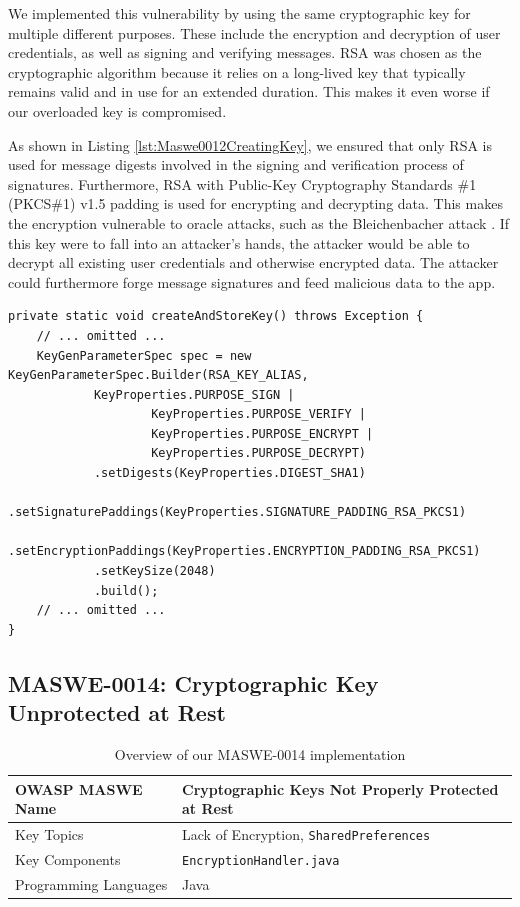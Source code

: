 We implemented this vulnerability by using the same cryptographic key for multiple different purposes. These include the encryption and decryption of user credentials, as well as signing and verifying messages. RSA was chosen as the cryptographic algorithm because it relies on a long-lived key that typically remains valid and in use for an extended duration. This makes it even worse if our overloaded key is compromised.

As shown in Listing \ref{lst:Maswe0012CreatingKey}, we ensured that only RSA is used for message digests involved in the signing and verification process of signatures. Furthermore, RSA with Public-Key Cryptography Standards \#1 (PKCS\#1) v1.5 padding is used for encrypting and decrypting data. This makes the encryption vulnerable to oracle attacks, such as the Bleichenbacher attack \cite{bleichenbacher1998}. If this key were to fall into an attacker's hands, the attacker would be able to decrypt all existing user credentials and otherwise encrypted data. The attacker could furthermore forge message signatures and feed malicious data to the app.

\begin{lstlisting}[style=JavaStyle, float=tbh, mathescape=true, captionpos=b, caption={Creating an RSA key with multiple functionalities}, label=lst:Maswe0012CreatingKey]
private static void createAndStoreKey() throws Exception {
    // ... omitted ...
    KeyGenParameterSpec spec = new KeyGenParameterSpec.Builder(RSA_KEY_ALIAS,
            KeyProperties.PURPOSE_SIGN |
                    KeyProperties.PURPOSE_VERIFY |
                    KeyProperties.PURPOSE_ENCRYPT |
                    KeyProperties.PURPOSE_DECRYPT)
            .setDigests(KeyProperties.DIGEST_SHA1)
            .setSignaturePaddings(KeyProperties.SIGNATURE_PADDING_RSA_PKCS1)
            .setEncryptionPaddings(KeyProperties.ENCRYPTION_PADDING_RSA_PKCS1)
            .setKeySize(2048)
            .build();
    // ... omitted ...
}
\end{lstlisting}


\subsection{MASWE-0014: Cryptographic Key Unprotected at Rest}

\begin{table}[H]
\centering
\renewcommand{\arraystretch}{1.3}
\begin{tabular}{p{5cm} p{8cm}} 
\toprule
OWASP MASWE Name & Cryptographic Keys Not Properly Protected at Rest \\ 
\midrule
Key Topics & Lack of Encryption, \texttt{SharedPreferences} \\
Key Components & \texttt{EncryptionHandler.java} \\
Programming Languages & Java \\ 
\bottomrule
\end{tabular}
\caption{Overview of our MASWE-0014 implementation}
\label{tab:maswe-0014}
\end{table}

